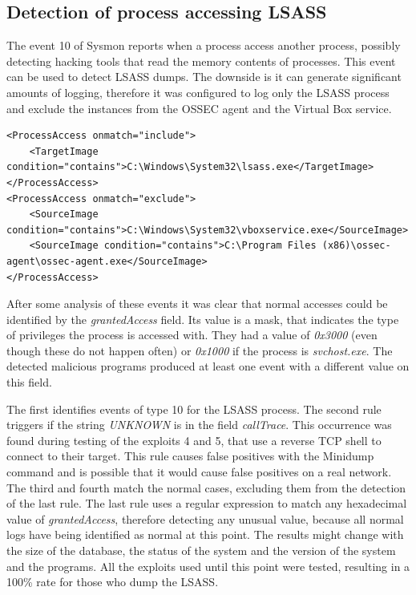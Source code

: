 \subsection{Detection of process accessing LSASS} \label{detect_lsass}
The event 10 of Sysmon reports when a process access another process, possibly detecting hacking tools that read the memory contents of processes\cite{sysmon}.
This event can be used to detect LSASS dumps\cite{sysmon_event_10_lsass}.
\linej
The downside is it can generate significant amounts of logging, therefore it was configured to log only the LSASS process and exclude the instances from the OSSEC agent and the Virtual Box service.
\linej
\begin{lstlisting}[style=xml,caption=Sysmon monitoring with event 10 for LSASS reads,captionpos=b]
<ProcessAccess onmatch="include">
	<TargetImage condition="contains">C:\Windows\System32\lsass.exe</TargetImage>
</ProcessAccess>
<ProcessAccess onmatch="exclude">
	<SourceImage condition="contains">C:\Windows\System32\vboxservice.exe</SourceImage>
	<SourceImage condition="contains">C:\Program Files (x86)\ossec-agent\ossec-agent.exe</SourceImage>
</ProcessAccess>
\end{lstlisting}
\linej
After some analysis of these events it was clear that normal accesses could be identified by the \textit{grantedAccess} field. Its value is a mask, that indicates the type of privileges the process is accessed with.
\linej
They had a value of \textit{0x3000} (even though these do not happen often) or \textit{0x1000} if the process is \textit{svchost.exe}. The detected malicious programs produced at least one event with a different value on this field.
\linej

\linej
The first identifies events of type 10 for the LSASS process.
\linej
The second rule triggers if the string \textit{UNKNOWN} is in the field \textit{callTrace}. This occurrence was found during testing of the exploits 4 and 5, that use a reverse TCP shell to connect to their target. This rule causes false positives with the Minidump command and is possible that it would cause false positives on a real network.
\linej
The third and fourth match the normal cases, excluding them from the detection of the last rule.
\linej
The last rule uses a regular expression to match any hexadecimal value of \textit{grantedAccess}, therefore detecting any unusual value, because all normal logs have being identified as normal at this point.
\linej
\linej
The results might change with the size of the database, the status of the system and the version of the system and the programs.
All the exploits used until this point were tested, resulting in a 100\% rate for those who dump the LSASS.

